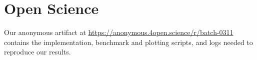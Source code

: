 \section*{Open Science}
\label{app:open-science}
Our anonymous artifact at
\url{https://anonymous.4open.science/r/batch-0311} contains the \methodname
implementation, benchmark and plotting scripts, and logs needed to reproduce
our results.
